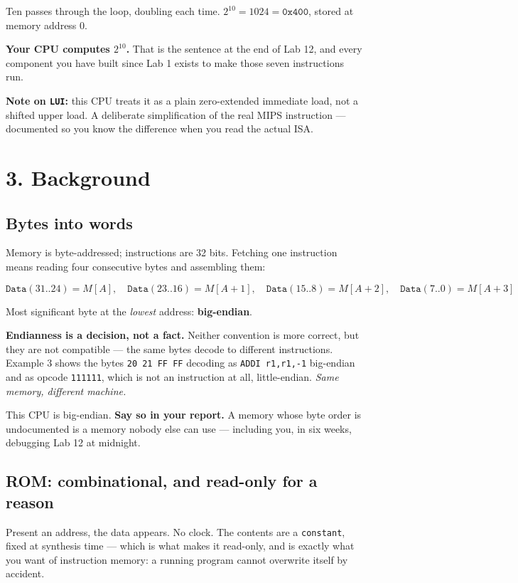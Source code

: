 \documentclass[11pt]{article}
\newcommand{\code}[1]{\texttt{#1}}
\begin{document}
Ten passes through the loop, doubling each time. $2^{10} = 1024 =
\code{0x400}$, stored at memory address 0.

\textbf{Your CPU computes $2^{10}$.} That is the sentence at the end of Lab 12,
and every component you have built since Lab 1 exists to make those seven
instructions run.

\textbf{Note on \code{LUI}:} this CPU treats it as a plain zero-extended
immediate load, not a shifted upper load. A deliberate simplification of the
real MIPS instruction --- documented so you know the difference when you read
the actual ISA.

\section*{3. Background}

\subsection*{Bytes into words}

Memory is byte-addressed; instructions are 32 bits. Fetching one instruction
means reading four consecutive bytes and assembling them:

\[
\code{Data}(31..24) = M[A],\quad
\code{Data}(23..16) = M[A{+}1],\quad
\code{Data}(15..8) = M[A{+}2],\quad
\code{Data}(7..0) = M[A{+}3]
\]

Most significant byte at the \emph{lowest} address: \textbf{big-endian}.

\textbf{Endianness is a decision, not a fact.} Neither convention is more
correct, but they are not compatible --- the same bytes decode to different
instructions. Example 3 shows the bytes \code{20 21 FF FF} decoding as
\code{ADDI r1,r1,-1} big-endian and as opcode \code{111111}, which is not an
instruction at all, little-endian. \emph{Same memory, different machine.}

This CPU is big-endian. \textbf{Say so in your report.} A memory whose byte
order is undocumented is a memory nobody else can use --- including you, in six
weeks, debugging Lab 12 at midnight.

\subsection*{ROM: combinational, and read-only for a reason}

Present an address, the data appears. No clock. The contents are a
\code{constant}, fixed at synthesis time --- which is what makes it read-only,
and is exactly what you want of instruction memory: a running program cannot
overwrite itself by accident.
\end{document}
